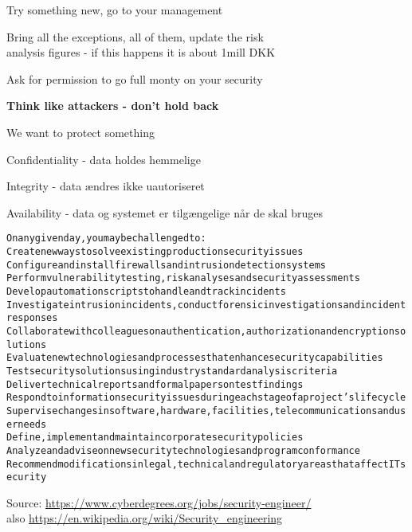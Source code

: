 \documentclass[Screen16to9,17pt]{foils}
\begin{document}
Try something new, go to your management

Bring all the exceptions, all of them, update the risk \\
analysis figures - if this happens it is about 1mill DKK

Ask for permission to go full monty on your security

{\bf Think like attackers - don't hold back}




\begin{list1}
\item We want to protect something
\item Confidentiality - data holdes hemmelige
\item Integrity - data ændres ikke uautoriseret
\item Availability - data og systemet er tilgængelige når de skal bruges
\end{list1}


\begin{alltt}\small
On any given day, you may be challenged to:
        Create new ways to solve existing production security issues
        Configure and install firewalls and intrusion detection systems
        Perform vulnerability testing, risk analyses and security assessments
        Develop automation scripts to handle and track incidents
        Investigate intrusion incidents, conduct forensic investigations and incident responses
        Collaborate with colleagues on authentication, authorization and encryption solutions
        Evaluate new technologies and processes that enhance security capabilities
        Test security solutions using industry standard analysis criteria
        Deliver technical reports and formal papers on test findings
        Respond to information security issues during each stage of a project’s lifecycle
        Supervise changes in software, hardware, facilities, telecommunications and user needs
        Define, implement and maintain corporate security policies
        Analyze and advise on new security technologies and program conformance
        Recommend modifications in legal, technical and regulatory areas that affect IT security
\end{alltt}

Source: \url{https://www.cyberdegrees.org/jobs/security-engineer/}\\
also
\url{https://en.wikipedia.org/wiki/Security_engineering}
\end{document}
